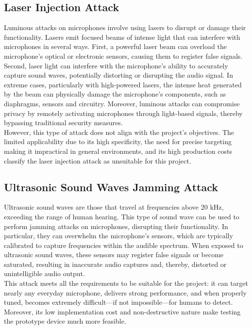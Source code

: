 \subsection{Laser Injection Attack}
Luminous attacks on microphones involve using lasers to disrupt or damage their functionality.
Lasers emit focused beams of intense light that can interfere with microphones in several ways.
First, a powerful laser beam can overload the microphone's optical or electronic sensors, causing them to register false signals.
Second, laser light can interfere with the microphone's ability to accurately capture sound waves, potentially distorting or disrupting the audio signal.
In extreme cases, particularly with high-powered lasers, the intense heat generated by the beam can physically damage the microphone's components, such as diaphragms, sensors and circuitry.
Moreover, luminous attacks can compromise privacy by remotely activating microphones through light-based signals, thereby bypassing traditional security measures. \\
However, this type of attack does not align with the project's objectives.
The limited applicability due to its high specificity, the need for precise targeting making it impractical in general environments, and its high production costs classify the laser injection attack as unsuitable for this project.
\subsection{Ultrasonic Sound Waves Jamming Attack}
Ultrasonic sound waves are those that travel at frequencies above 20 kHz, exceeding the range of human hearing.
This type of sound wave can be used to perform jamming attacks on microphones, disrupting their functionality.
In particular, they can overwhelm the microphone's sensors, which are typically calibrated to capture frequencies within the audible spectrum.
When exposed to ultrasonic sound waves, these sensors may register false signals or become saturated, resulting in inaccurate audio captures and, thereby, distorted or unintelligible audio output. \\
This attack meets all the requirements to be suitable for the project: it can target nearly any everyday microphone, delivers strong performance, and when properly tuned, becomes extremely difficult—if not impossible—for humans to detect.
Moreover, its low implementation cost and non-destructive nature make testing the prototype device much more feasible.